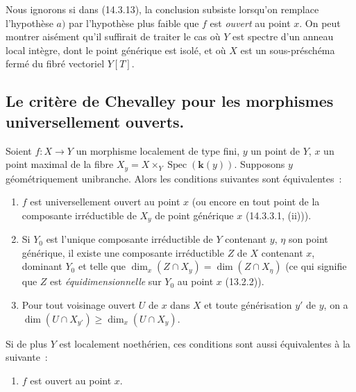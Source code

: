 \begin{remark}[14.3.14]
\label{IV.14.3.14-fr}
Nous ignorons si dans (14.3.13), la conclusion subsiste lorsqu'on remplace
l'hypothèse $a)$ par l'hypothèse plus faible que $f$ est \emph{ouvert} au point $x$. On
peut montrer aisément qu'il suffirait de traiter le cas où $Y$ est spectre d'un
anneau local intègre, dont le point générique est isolé, et où $X$ est un
sous-préschéma fermé du fibré vectoriel $Y[T]$.
\end{remark}

\subsection{Le critère de Chevalley pour les morphismes universellement ouverts.}
\label{subsection:IV.14.4-fr}

\begin{theorem}[14.4.1]
Soient $f:X\to Y$ un morphisme localement de type fini, $y$ un point de $Y$, $x$
un point maximal de la fibre $X_y=X\times_Y\operatorname{Spec}(\boldsymbol{k}(y))$. Supposons
$y$ \textup{géométriquement unibranche}. Alors les conditions suivantes sont équivalentes~:
\begin{enumerate}[label=\emph{\alph*)}]
  \item $f$ est universellement ouvert au point $x$ \textup{(ou encore en tout point de la
  composante irréductible de $X_y$ de point générique $x$ (14.3.3.1, (ii)))}.


  \item Si $Y_0$ est l'unique composante irréductible de $Y$ contenant $y$, $\eta$
  son point générique, il existe une composante irréductible $Z$ de $X$ contenant
  $x$, dominant $Y_0$ et telle que
  $\dim_x(Z\cap X_y)=\dim(Z\cap X_\eta)$ \textup{(ce qui signifie que $Z$ est
  \emph{équidimensionnelle} sur $Y_0$ au point $x$ (13.2.2))}.
  \item[\textup{b$'$)}] Pour tout voisinage ouvert $U$ de $x$ dans $X$ et toute
  générisation $y'$ de $y$, on a
  $\dim(U\cap X_{y'})\geq\dim_x(U\cap X_y)$.
\end{enumerate}

Si de plus $Y$ est localement noethérien, ces conditions sont aussi équivalentes à
la suivante~:
\begin{enumerate}[label=\emph{\alph*)}]
  \item[\textup{c)}] $f$ est ouvert au point $x$.
\end{enumerate}
\end{theorem}

